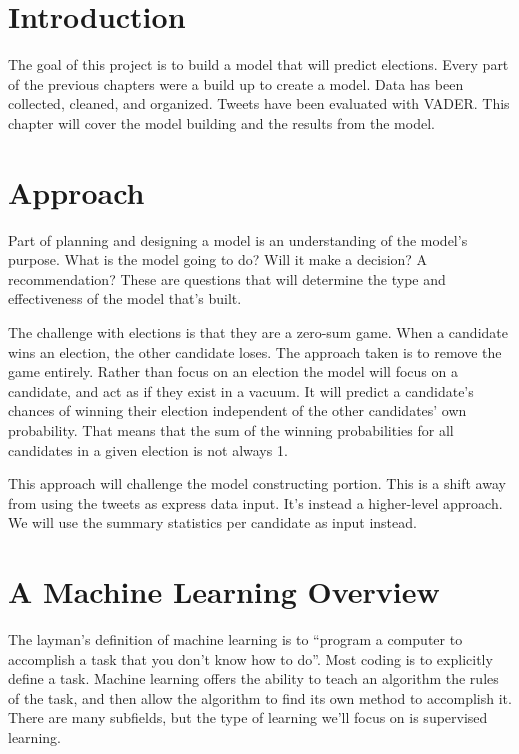 \documentclass[11pt, twoside, reqno]{article}
\begin{document}
\section{Introduction}
\hspace{0.2in}The goal of this project is to build a model that will predict elections. Every part of the previous chapters were a build up to create a model. Data has been collected, cleaned, and organized. Tweets have been evaluated with VADER. This chapter will cover the model building and the results from the model. 

\section{Approach}
\hspace{0.2in}Part of planning and designing a model is an understanding of the model's purpose. What is the model going to do? Will it make a decision? A recommendation? These are questions that will determine the type and effectiveness of the model that's built. 

The challenge with elections is that they are a zero-sum game. When a candidate wins an election, the other candidate loses. The approach taken is to remove the game entirely. Rather than focus on an election the model will focus on a candidate, and act as if they exist in a vacuum. It will predict a candidate's chances of winning their election independent of the other candidates' own probability. That means that the sum of the winning probabilities for all candidates in a given election is not always 1.

This approach will challenge the model constructing portion. This is a shift away from using the tweets as express data input. It's instead a higher-level approach. We will use the summary statistics per candidate as input instead. 

\section{A Machine Learning Overview}
\hspace{0.2in} The layman's definition of machine learning is to ``program a computer to accomplish a task that you don't know how to do''. Most coding is to explicitly define a task. Machine learning offers the ability to teach an algorithm the rules of the task, and then allow the algorithm to find its own method to accomplish it. There are many subfields, but the type of learning we'll focus on is supervised learning. 
\end{document}
